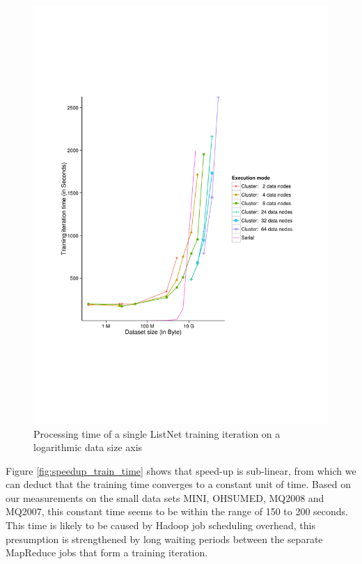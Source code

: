 \begin{figure}
\centering
\includegraphics[trim=0cm 5cm 0cm 5cm, scale=0.8]{gfx/time_single_logx.pdf}
\caption{Processing time of a single ListNet training iteration on a logarithmic data size axis}
\label{fig:listnet_train_time_log}
\end{figure}

Figure \ref{fig:speedup_train_time} shows that speed-up is sub-linear, from which we can deduct that the training time converges to a constant unit of time. Based on our measurements on the small data sets MINI, OHSUMED, MQ2008 and MQ2007, this constant time seems to be within the range of 150 to 200 seconds. This time is likely to be caused by Hadoop job scheduling overhead, this presumption is strengthened by long waiting periods between the separate MapReduce jobs that form a training iteration.\\

